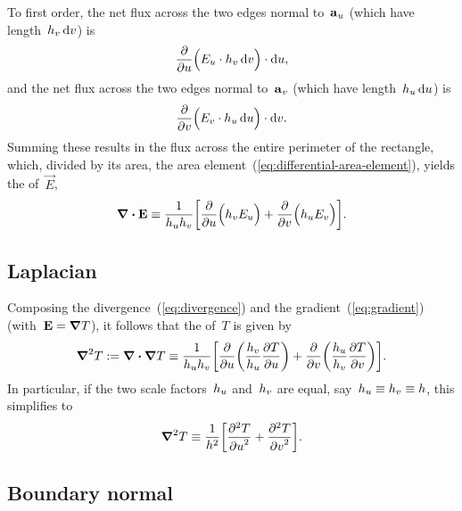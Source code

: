 To first order,
the net flux across the two edges normal to~$\mathop{}\!\boldsymbol{\mathbf{a}}_{u}$
(which have length~$\scalefac[v] \td v$) is
\[
  \pder{}{u} \roundbr[\Big]{
    \comp{E}{u} \cdot \scalefac[v] \td v
  } \cdot \td u,
\]
and the net flux across the two edges normal to~$\mathop{}\!\boldsymbol{\mathbf{a}}_{v}$
(which have length~$\scalefac[u] \td u$) is
\[
  \pder{}{v} \roundbr[\Big]{
    \comp{E}{v} \cdot \scalefac[u] \td u
  } \cdot \td v.
\]
Summing these results in the flux across the entire perimeter of the rectangle,
which, divided by its area,
the area element~(\ref{eq:differential-area-element}),
yields the  of~$\vec{E}$,
\begin{equation}
  \del \dotp \vec{E} \ideq
    \frac{1}{\scalefac[u] \scalefac[v]}
    \squarebr*{
      \pder{}{u} \roundbr[\Big]{\scalefac[v] \comp{E}{u}}
        +
      \pder{}{v} \roundbr[\Big]{\scalefac[u] \comp{E}{v}}
    }.
  \label{eq:divergence}
\end{equation}

\subsection{Laplacian}
\label{sec:curvilinear.calculus.laplacian}

Composing the divergence~(\ref{eq:divergence})
and the gradient~(\ref{eq:gradient}) (with~$\boldsymbol{\mathbf{E}} = \mathop{}\!\boldsymbol{\mathbf{\nabla}} T$),
it follows that the  of~$T$ is given by
\begin{equation}
  \del^2 T \defeq \del \dotp \del T \ideq
    \frac{1}{\scalefac[u] \scalefac[v]}
    \squarebr*{
      \pder{}{u} \roundbr*{\frac{\scalefac[v]}{\scalefac[u]} \pder{T}{u}}
        +
      \pder{}{v} \roundbr*{\frac{\scalefac[u]}{\scalefac[v]} \pder{T}{v}}
    }.
  \label{eq:laplacian}
\end{equation}
In particular,
if the two scale factors~$\scalefac[u]$ and~$\scalefac[v]$ are equal,
say~$\scalefac[u] \ideq \scalefac[v] \ideq \scalefac$,
this simplifies to
\begin{equation}
  \del^2 T \ideq
    \frac{1}{\scalefac^2}
    \squarebr*{\pder[2]{T}{u} + \pder[2]{T}{v}}.
  \label{eq:laplacian-scale-factors-equal}
\end{equation}

\subsection{Boundary normal}
\label{sec:curvilinear.calculus.normal}

